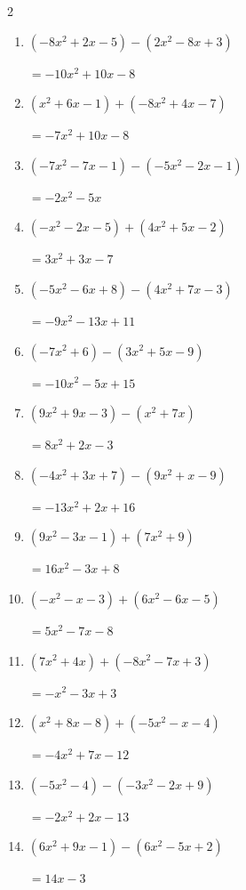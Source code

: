 \begin{multicols}{2}
\begin{enumerate}
  \item $(-8x^{2}+2x-5)-(2x^{2}-8x+3)$

        $=-10x^{2}+10x-8$

\columnbreak %

  \item $(x^{2}+6x-1)+(-8x^{2}+4x-7)$

        $=-7x^{2}+10x-8$

  \item $(-7x^{2}-7x-1)-(-5x^{2}-2x-1)$

        $=-2x^{2}-5x$

  \item $(-x^{2}-2x-5)+(4x^{2}+5x-2)$

        $=3x^{2}+3x-7$

  \item $(-5x^{2}-6x+8)-(4x^{2}+7x-3)$

        $=-9x^{2}-13x+11$

  \item $(-7x^{2}+6)-(3x^{2}+5x-9)$

        $=-10x^{2}-5x+15$

  \item $(9x^{2}+9x-3)-(x^{2}+7x)$

        $=8x^{2}+2x-3$

  \item $(-4x^{2}+3x+7)-(9x^{2}+x-9)$

        $=-13x^{2}+2x+16$

  \item $(9x^{2}-3x-1)+(7x^{2}+9)$

        $=16x^{2}-3x+8$

  \item $(-x^{2}-x-3)+(6x^{2}-6x-5)$

        $=5x^{2}-7x-8$

  \item $(7x^{2}+4x)+(-8x^{2}-7x+3)$

        $=-x^{2}-3x+3$

  \item $(x^{2}+8x-8)+(-5x^{2}-x-4)$

        $=-4x^{2}+7x-12$

  \item $(-5x^{2}-4)-(-3x^{2}-2x+9)$

        $=-2x^{2}+2x-13$

  \item $(6x^{2}+9x-1)-(6x^{2}-5x+2)$

        $=14x-3$


\end{enumerate}
\end{multicols}
